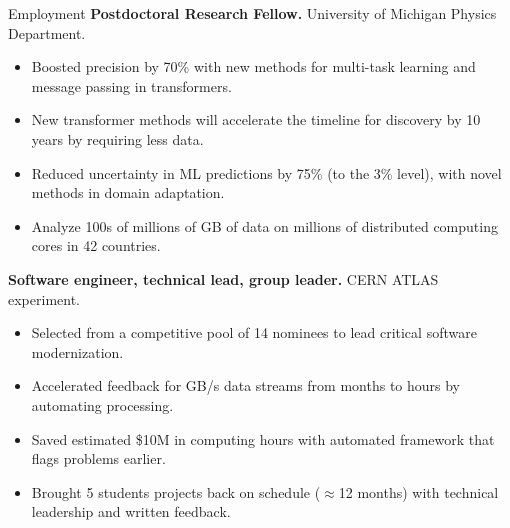 \begin{rubric}{Employment}
\entry*[2023 -- present]%
	\textbf{Postdoctoral Research Fellow.} University of Michigan Physics Department. \linebreak
    \vspace{-1.5em}
    \hspace{-1em}%
    \begin{itemize}
        \setlength\itemsep{0em}
        \setlength{\itemindent}{-10em}
        \item Boosted precision by 70\% with new methods for multi-task learning and message passing in transformers. 
        \item New transformer methods will accelerate the timeline for discovery by 10 years by requiring less data.
        \item Reduced uncertainty in ML predictions by 75\% (to the 3\% level), with novel methods in domain adaptation.
        \item Analyze 100s of millions of GB of data on millions of distributed computing cores in 42 countries.
    \end{itemize}
%
\entry*[2024 -- 2025]%
	\textbf{Software engineer, technical lead, group leader.} CERN ATLAS experiment. \linebreak
    \vspace{-1.5em}
    \hspace{-1em}%
    \begin{itemize}
    \setlength\itemsep{0em}
        \setlength{\itemindent}{-10em}
        \item Selected from a competitive pool of 14 nominees to lead critical software modernization.
        \item Accelerated feedback for GB/s data streams from months to hours by automating processing.
        \item Saved estimated \$10M in computing hours with automated framework that flags problems earlier. 
        \item Brought 5 students projects back on schedule ($\approx$12 months) with technical leadership and written feedback.
    \end{itemize}
%
\end{rubric}